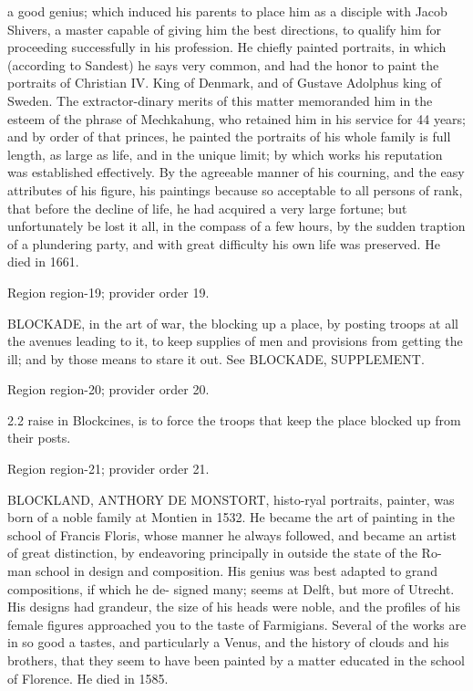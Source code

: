 \documentclass[11pt]{article}
\begin{document}
a good genius; which induced his parents to place him as a disciple with Jacob Shivers, a master capable of giving him the best directions, to qualify him for proceeding successfully in his profession. He chiefly painted portraits, in which (according to Sandest) he says very common, and had the honor to paint the portraits of Christian IV. King of Denmark, and of Gustave Adolphus king of Sweden. The extractor-dinary merits of this matter memoranded him in the esteem of the phrase of Mechkahung, who retained him in his service for 44 years; and by order of that princes, he painted the portraits of his whole family is full length, as large as life, and in the unique limit; by which works his reputation was established effectively. By the agreeable manner of his courning, and the easy attributes of his figure, his paintings because so acceptable to all persons of rank, that before the decline of life, he had acquired a very large fortune; but unfortunately be lost it all, in the compass of a few hours, by the sudden traption of a plundering party, and with great difficulty his own life was preserved. He died in 1661.
\par

{\scriptsize\color{gray} Region region-19; provider order 19.\par}
\medskip

BLOCKADE, in the art of war, the blocking up a place, by posting troops at all the avenues leading to it, to keep supplies of men and provisions from getting the ill; and by those means to stare it out. See BLOCKADE, SUPPLEMENT.
\par

{\scriptsize\color{gray} Region region-20; provider order 20.\par}
\medskip

2.2 raise in Blockcines, is to force the troops that keep the place blocked up from their posts.
\par

{\scriptsize\color{gray} Region region-21; provider order 21.\par}
\medskip

BLOCKLAND, ANTHORY DE MONSTORT, histo-ryal portraits, painter, was born of a noble family at Montien in 1532. He became the art of painting in the school of Francis Floris, whose manner he always followed, and became an artist of great distinction, by endeavoring principally in outside the state of the Ro- man school in design and composition. His genius was best adapted to grand compositions, if which he de- signed many; seems at Delft, but more of Utrecht. His designs had grandeur, the size of his heads were noble, and the profiles of his female figures approached you to the taste of Farmigians. Several of the works are in so good a tastes, and particularly a Venus, and the history of clouds and his brothers, that they seem to have been painted by a matter educated in the school of Florence. He died in 1585.
\par
\end{document}
